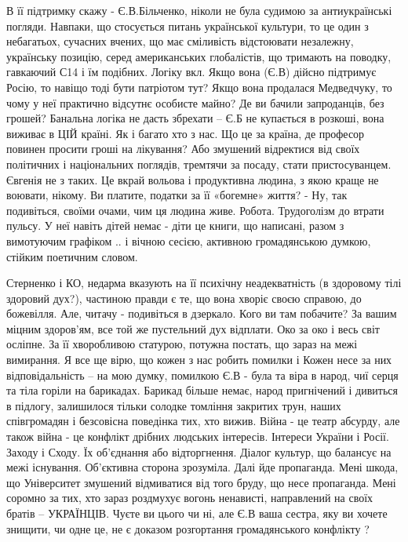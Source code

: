В її підтримку скажу - Є.В.Більченко, ніколи не була судимою за антиукраїнські
погляди. Навпаки, що стосується питань української культури, то це один з
небагатьох, сучасних вчених, що має сміливість відстоювати незалежну,
українську позицію, серед американських глобалістів, що тримають на поводку,
гавкаючий С14 і їм подібних. Логіку вкл. Якщо вона (Є.В) дійсно підтримує
Росію, то навіщо тоді бути патріотом тут? Якщо вона продалася Медведчуку, то
чому у неї практично відсутнє особисте майно? Де ви бачили запроданців, без
грошей? Банальна логіка не дасть збрехати – Є.Б не купається в розкоші, вона
виживає в ЦІЙ країні. Як і багато хто з нас. Що це за країна, де професор
повинен просити гроші на лікування? Або змушений відректися від своїх
політичних і національних поглядів, тремтячи за посаду, стати пристосуванцем.
Євгенія не з таких. Це вкрай вольова і продуктивна людина, з якою краще не
воювати, нікому. Ви платите, податки за її «богемне» життя? - Ну, так
подивіться, своїми очами, чим ця людина живе. Робота. Трудоголізм до втрати
пульсу. У неї навіть дітей немає - діти це книги, що написані, разом з
вимотуючим графіком .. і вічною сесією, активною громадянською думкою, стійким
поетичним словом.

Стерненко і КО, недарма вказують на її психічну неадекватність (в здоровому
тілі здоровий дух?), частиною правди є те, що вона хворіє своєю справою, до
божевілля. Але, читачу - подивіться в дзеркало. Кого ви там побачите? За вашим
міцним здоров'ям, все той же пустельний дух відплати. Око за око і весь світ
осліпне. За її хворобливою статурою, потужна постать, що зараз на межі
вимирання. Я все ще вірю, що кожен з нас робить помилки і Кожен несе за них
відповідальність – на мою думку, помилкою Є.В - була та віра в народ, чиї серця
та тіла горіли на барикадах. Барикад більше немає, народ пригнічений і дивиться
в підлогу, залишилося тільки солодке томління закритих трун, наших співгромадян
і безсовісна поведінка тих, хто вижив. Війна - це театр абсурду, але також
війна - це конфлікт дрібних людських інтересів. Інтереси України і Росії.
Заходу і Сходу. Їх об'єднання або відторгнення. Діалог культур, що балансує на
межі існування. Об'єктивна сторона зрозуміла. Далі йде пропаганда. Мені шкода,
що Університет змушений відмиватися від того бруду, що несе пропаганда. Мені
соромно за тих, хто зараз роздмухує вогонь ненависті, направлений на своїх
братів – УКРАЇНЦІВ. Чуєте ви цього чи ні, але Є.В ваша сестра, яку ви хочете
знищити, чи одне це, не є доказом розгортання громадянського конфлікту ? 

